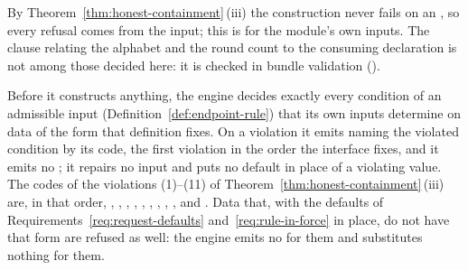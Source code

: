 
By Theorem~\ref{thm:honest-containment}\,(iii) the construction never fails on an
, so every refusal comes from the input; this is
 for the module's own inputs.
The clause relating the alphabet and the round count to the consuming
declaration is not among those decided here: it is checked in bundle
validation
().

\begin{requirement}\label{req:input-refusal}
Before it constructs anything, the engine decides exactly every condition of
an admissible input (Definition~\ref{def:endpoint-rule}) that its own inputs
determine on data of the form that definition fixes. On a violation it emits
 naming the violated condition by its code, the
first violation in the order the interface fixes, and it emits no
; it repairs no input and puts no default in place of a
violating value. The codes of the violations (1)--(11) of
Theorem~\ref{thm:honest-containment}\,(iii) are, in that order,
, ,
, ,
, ,
, ,
,  and
. Data that, with the defaults of
Requirements~\ref{req:request-defaults} and~\ref{req:rule-in-force} in place,
do not have that form are refused as well: the engine emits no
 for them and substitutes nothing for them.
\end{requirement}
